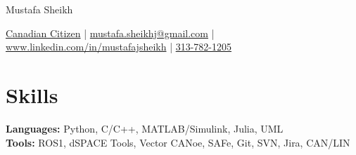 \documentclass[11pt]{article}       %
\begin{document}
\centerline{\Huge Mustafa Sheikh}

\vspace{5pt}

\centerline{\href{}{Canadian Citizen} | \href{mailto:mustafa.sheikhj@gmail.com}{mustafa.sheikhj@gmail.com} | \href{wwww.linkedin.com/in/mustafajsheikh}{www.linkedin.com/in/mustafajsheikh} | \href{}{313-782-1205}}

\vspace{-10pt}

\section*{Skills}
\textbf{Languages:} Python, C/C++, MATLAB/Simulink, Julia, UML\\ 
\textbf{Tools:} ROS1, dSPACE Tools, Vector CANoe, SAFe, Git, SVN, Jira, CAN/LIN\\
\vspace{-6.5pt}

\end{document}
